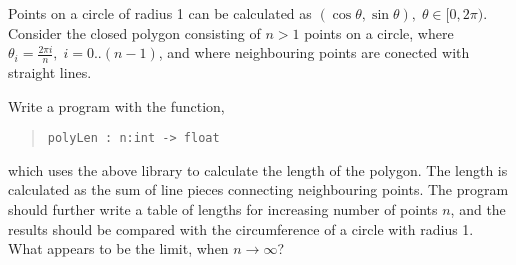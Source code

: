 Points on a circle of radius 1 can be calculated as $(\cos \theta, \sin \theta), \;\theta\in [0,2\pi)$. Consider the closed polygon consisting of $n>1$ points on a circle, where $\theta_i = \frac{2\pi i}{n},\; i = 0..(n-1)$, and where neighbouring points are conected with straight lines.

Write a program with the function,
\begin{quote}
  \lstinline{polyLen : n:int -> float}
\end{quote}
which uses the above library to calculate the length of the polygon. The length is calculated as the sum of line pieces connecting neighbouring points. The program should further write a table of lengths for increasing number of points $n$, and the results should be compared with the circumference of a circle with radius 1. What appears to be the limit, when $n\rightarrow\infty$?
